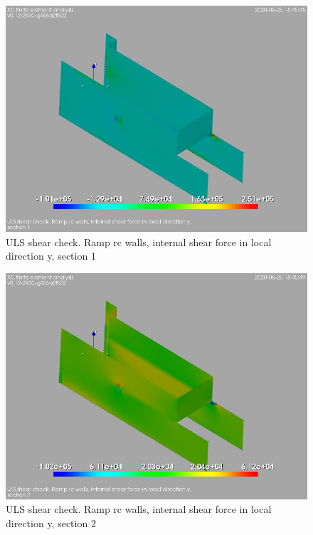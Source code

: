 \begin{figure}
\begin{center}
\includegraphics[width=\linewidth]{ramp_wall/resLC/text/graphics/shearULS/wallsVySect1}
\caption{ULS shear check. Ramp rc walls, internal shear force in local direction y, section 1}
\end{center}
\end{figure}
\begin{figure}
\begin{center}
\includegraphics[width=\linewidth]{ramp_wall/resLC/text/graphics/shearULS/wallsVySect2}
\caption{ULS shear check. Ramp rc walls, internal shear force in local direction y, section 2}
\end{center}
\end{figure}
